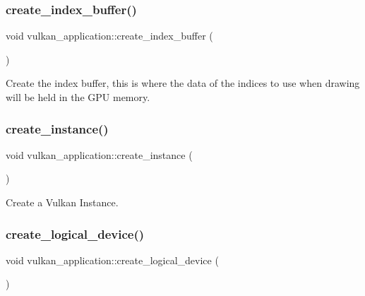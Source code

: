 \subsubsection{\texorpdfstring{create\+\_\+index\+\_\+buffer()}{create\_index\_buffer()}}
{\footnotesize\ttfamily void vulkan\+\_\+application\+::create\+\_\+index\+\_\+buffer (\begin{DoxyParamCaption}{ }\end{DoxyParamCaption})\hspace{0.3cm}{\ttfamily [private]}}



Create the index buffer, this is where the data of the indices to use when drawing will be held in the G\+PU memory. 

\mbox{\label{classvulkan__application_a7eeae31c672464518ea0ba45ca39c00b}} 
\subsubsection{\texorpdfstring{create\+\_\+instance()}{create\_instance()}}
{\footnotesize\ttfamily void vulkan\+\_\+application\+::create\+\_\+instance (\begin{DoxyParamCaption}{ }\end{DoxyParamCaption})\hspace{0.3cm}{\ttfamily [private]}}



Create a Vulkan Instance. 

\mbox{\label{classvulkan__application_a495dd01f2cac024f7ee25423eeaf2f84}} 
\subsubsection{\texorpdfstring{create\+\_\+logical\+\_\+device()}{create\_logical\_device()}}
{\footnotesize\ttfamily void vulkan\+\_\+application\+::create\+\_\+logical\+\_\+device (\begin{DoxyParamCaption}{ }\end{DoxyParamCaption})\hspace{0.3cm}{\ttfamily [private]}}



